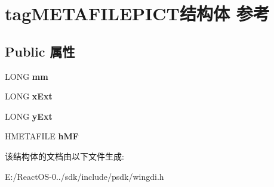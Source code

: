\hypertarget{structtag_m_e_t_a_f_i_l_e_p_i_c_t}{}\section{tag\+M\+E\+T\+A\+F\+I\+L\+E\+P\+I\+C\+T结构体 参考}
\label{structtag_m_e_t_a_f_i_l_e_p_i_c_t}
\subsection*{Public 属性}
\begin{DoxyCompactItemize}
\item 
\mbox{\label{structtag_m_e_t_a_f_i_l_e_p_i_c_t_a45c121757e77f1109a50ff21b86d4581}} 
L\+O\+NG {\bfseries mm}
\item 
\mbox{\label{structtag_m_e_t_a_f_i_l_e_p_i_c_t_ae5b6a5a569893cf2e024d7d3925bb556}} 
L\+O\+NG {\bfseries x\+Ext}
\item 
\mbox{\label{structtag_m_e_t_a_f_i_l_e_p_i_c_t_a29d31ee7d28ae382b4dd7972e040028c}} 
L\+O\+NG {\bfseries y\+Ext}
\item 
\mbox{\label{structtag_m_e_t_a_f_i_l_e_p_i_c_t_a48a03c07f78cac2b0cbb3eeea5fadc48}} 
H\+M\+E\+T\+A\+F\+I\+LE {\bfseries h\+MF}
\end{DoxyCompactItemize}


该结构体的文档由以下文件生成\+:\begin{DoxyCompactItemize}
\item 
E\+:/\+React\+O\+S-\/0../sdk/include/psdk/wingdi.\+h\end{DoxyCompactItemize}

